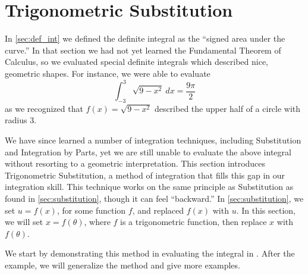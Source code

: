 \section{Trigonometric Substitution}\label{sec:trig_sub}

In \autoref{sec:def_int} we defined the definite integral as the ``signed area under the curve.'' In that section we had not yet learned the Fundamental Theorem of Calculus, so we evaluated special definite integrals which described nice, geometric shapes. For instance, we were able to evaluate
\begin{equation}
\int_{-3}^3\sqrt{9-x^2}\ dx = \frac{9\pi}{2}\label{eq:trigsub1}
\end{equation}
 as we recognized that $f(x) = \sqrt{9-x^2}$ described the upper half of a circle with radius 3. 

We have since learned a number of integration techniques, including Substitution and Integration by Parts, yet we are still unable to evaluate the above integral without resorting to a geometric interpretation. This section introduces Trigonometric Substitution, a method of integration that fills this gap in our integration skill. This technique works on the same principle as Substitution as found in \autoref{sec:substitution}, though it can feel ``backward.'' In \autoref{sec:substitution}, we set $u=f(x)$, for some function $f$, and replaced $f(x)$ with $u$. In this section, we will set $x=f(\theta)$, where $f$ is a trigonometric function, then replace $x$ with $f(\theta)$. 


We start by demonstrating this method in evaluating the integral in . After the example, we will generalize the method and give more examples.

